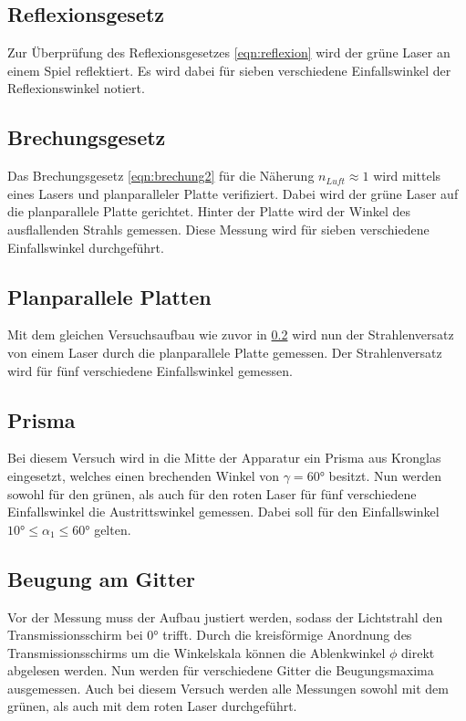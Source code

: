 \subsection{Reflexionsgesetz}
\label{sec:reflexionsmessung}
Zur Überprüfung des Reflexionsgesetzes \eqref{eqn:reflexion} wird der grüne Laser an einem Spiel reflektiert. Es wird dabei für
sieben verschiedene Einfallswinkel der Reflexionswinkel notiert.

\subsection{Brechungsgesetz}
\label{sec:brechungmessung}
Das Brechungsgesetz \eqref{eqn:brechung2} für die Näherung $n_{Luft}\approx1$ wird mittels eines Lasers und planparalleler Platte
verifiziert. Dabei wird der grüne Laser auf die planparallele Platte gerichtet. Hinter der Platte wird der Winkel des ausflallenden
Strahls gemessen. Diese Messung wird für sieben verschiedene Einfallswinkel durchgeführt.

\subsection{Planparallele Platten}
\label{sec:planplattemessung}
Mit dem gleichen Versuchsaufbau wie zuvor in \ref{sec:brechungmessung} wird nun der Strahlenversatz von einem Laser durch die
planparallele Platte gemessen. Der Strahlenversatz wird für fünf verschiedene Einfallswinkel gemessen.

\subsection{Prisma}
\label{sec:prismamessung}
Bei diesem Versuch wird in die Mitte der Apparatur ein Prisma aus Kronglas eingesetzt, welches einen brechenden Winkel von
$\gamma=60°$ besitzt. Nun werden sowohl für den grünen, als auch für den roten Laser für fünf verschiedene Einfallswinkel
die Austrittswinkel gemessen. Dabei soll für den Einfallswinkel $10°\leq\alpha_1\leq 60°$ gelten.

\subsection{Beugung am Gitter}
\label{sec:beugungmessung}
Vor der Messung muss der Aufbau justiert werden, sodass der Lichtstrahl den Transmissionsschirm bei $0°$ trifft. Durch die
kreisförmige Anordnung des Transmissionsschirms um die Winkelskala können die Ablenkwinkel $\phi$ direkt abgelesen werden.
Nun werden für verschiedene Gitter die Beugungsmaxima ausgemessen.
Auch bei diesem Versuch werden alle Messungen sowohl mit dem grünen, als auch mit dem roten Laser durchgeführt.
